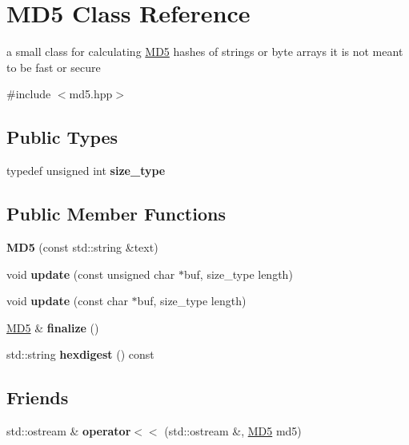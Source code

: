 \hypertarget{classMD5}{}\section{MD5 Class Reference}
\label{classMD5}


a small class for calculating \mbox{\hyperlink{classMD5}{M\+D5}} hashes of strings or byte arrays it is not meant to be fast or secure  




{\ttfamily \#include $<$md5.\+hpp$>$}

\subsection*{Public Types}
\begin{DoxyCompactItemize}
\item 
\mbox{\label{classMD5_aa836972700679dbcff6ae8337f6db464}} 
typedef unsigned int {\bfseries size\+\_\+type}
\end{DoxyCompactItemize}
\subsection*{Public Member Functions}
\begin{DoxyCompactItemize}
\item 
\mbox{\label{classMD5_a155356ffd713345e69e6dcbd9f8da6ce}} 
{\bfseries M\+D5} (const std\+::string \&text)
\item 
\mbox{\label{classMD5_ac5ddf6cd8f940422396d321ea90ed045}} 
void {\bfseries update} (const unsigned char $\ast$buf, size\+\_\+type length)
\item 
\mbox{\label{classMD5_ac5ccba375539b993958fb235f8ac849c}} 
void {\bfseries update} (const char $\ast$buf, size\+\_\+type length)
\item 
\mbox{\label{classMD5_a10f607494a3f2e3e515fc4b99d1a06cc}} 
\mbox{\hyperlink{classMD5}{M\+D5}} \& {\bfseries finalize} ()
\item 
\mbox{\label{classMD5_aaf466f683b4bd8b1b66544f48bf09608}} 
std\+::string {\bfseries hexdigest} () const
\end{DoxyCompactItemize}
\subsection*{Friends}
\begin{DoxyCompactItemize}
\item 
\mbox{\label{classMD5_a0739666fd0f3a7117546f6c50e0783b2}} 
std\+::ostream \& {\bfseries operator$<$$<$} (std\+::ostream \&, \mbox{\hyperlink{classMD5}{M\+D5}} md5)
\end{DoxyCompactItemize}


